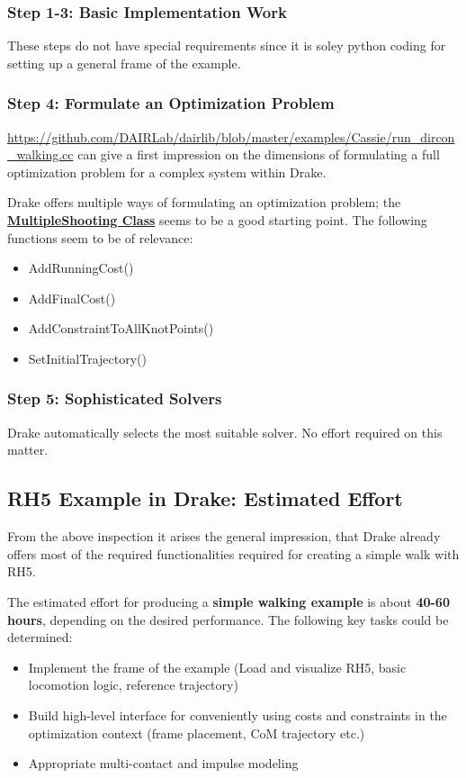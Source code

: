 \subsubsection{Step 1-3: Basic Implementation Work}
These steps do not have special requirements since it is soley python coding for setting up a general frame of the example.
\subsubsection{Step 4: Formulate an Optimization Problem}
\url{https://github.com/DAIRLab/dairlib/blob/master/examples/Cassie/run_dircon_walking.cc} can give a first impression on the dimensions of formulating a full optimization problem for a complex system within Drake. 

Drake offers multiple ways of formulating an optimization problem; the \href{https://drake.mit.edu/doxygen_cxx/classdrake_1_1systems_1_1trajectory__optimization_1_1_multiple_shooting.html}{\textbf{MultipleShooting Class}} seems to be a good starting point. The following functions seem to be of relevance: 
\begin{itemize}
\item AddRunningCost()
\item AddFinalCost()
\item AddConstraintToAllKnotPoints()
\item SetInitialTrajectory()
\end{itemize}
\subsubsection{Step 5: Sophisticated Solvers}
Drake automatically selects the most suitable solver. No effort required on this matter.
 
\subsection{RH5 Example in Drake: Estimated Effort}
From the above inspection it arises the general impression, that Drake already offers most of the required functionalities required for creating a simple walk with RH5. 

The estimated effort for producing a \textbf{simple walking example} is about \textbf{40-60 hours}, depending on the desired performance. 
The following key tasks could be determined: 
\begin{itemize}
\item Implement the frame of the example (Load and visualize RH5, basic locomotion logic, reference trajectory)
\item Build high-level interface for conveniently using costs and constraints in the optimization context (frame placement, CoM trajectory etc.)
\item Appropriate multi-contact and impulse modeling
\end{itemize}


